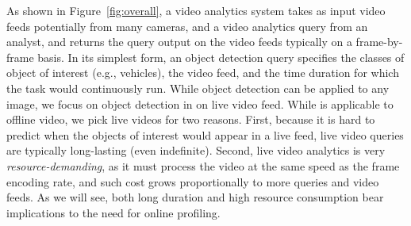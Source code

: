 As shown in Figure~\ref{fig:overall}, 
a video analytics system takes as input video feeds potentially from
many cameras, and a video analytics query from an analyst,
and returns the query output on the video feeds typically on a 
frame-by-frame basis.
In its simplest form, an object detection query specifies the classes 
of object of interest (e.g., vehicles), the video feed, and the 
time duration for which the task would continuously run. 
While object detection can be applied to any image, we focus on object 
detection in on live video feed. 
While \name is applicable to offline video, we pick live videos
for two reasons.
First, because it is hard to predict when the objects of interest 
would appear in a live feed, live video queries are typically 
long-lasting (even indefinite).
Second, live video analytics is very {\em resource-demanding}, as it
must process the video at the same speed as the frame encoding rate,
and such cost grows proportionally to more queries and video feeds.
As we will see, both long duration and high resource consumption 
bear implications to the need for online profiling.

